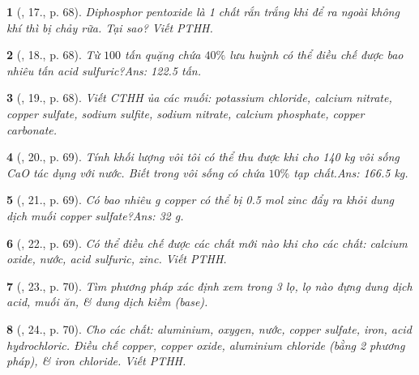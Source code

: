 \documentclass{article}
\newtheorem{baitoan}{}
\begin{document}
\begin{baitoan}[\cite{An_Hoa_Hoc_nang_cao_8_9}, 17., p. 68]
	Diphosphor pentoxide là 1 chất rắn trắng khi để ra ngoài không khí thì bị chảy rữa. Tại sao? Viết {\rm PTHH}.
\end{baitoan}
\begin{baitoan}[\cite{An_Hoa_Hoc_nang_cao_8_9}, 18., p. 68]
	Từ $100$ tấn quặng chứa $40\%$ lưu huỳnh có thể điều chế được bao nhiêu tấn acid sulfuric?\hfill{\sf Ans: 122.5 tấn.}
\end{baitoan}

\begin{baitoan}[\cite{An_Hoa_Hoc_nang_cao_8_9}, 19., p. 68]
	Viết {\rm CTHH} ủa các muối: potassium chloride, calcium nitrate, copper sulfate, sodium sulfite, sodium nitrate, calcium phosphate, copper carbonate.
\end{baitoan}

\begin{baitoan}[\cite{An_Hoa_Hoc_nang_cao_8_9}, 20., p. 69]
	Tính khối lượng vôi tôi {\rm{}} có thể thu được khi cho {\rm 140 kg} vôi sống {\rm CaO} tác dụng với nước. Biết trong vôi sống có chứa $10\%$ tạp chất.\hfill{\sf Ans: 166.5 kg.}
\end{baitoan}

\begin{baitoan}[\cite{An_Hoa_Hoc_nang_cao_8_9}, 21., p. 69]
	Có bao nhiêu {\rm g} copper có thể bị {\rm0.5 mol} zinc đẩy ra khỏi dung dịch muối copper sulfate?\hfill{\sf Ans: 32 g.}
\end{baitoan}

\begin{baitoan}[\cite{An_Hoa_Hoc_nang_cao_8_9}, 22., p. 69]
	Có thể điều chế được các chất mới nào khi cho các chất: calcium oxide, nước, acid sulfuric, zinc. Viết {\rm PTHH}.
\end{baitoan}

\begin{baitoan}[\cite{An_Hoa_Hoc_nang_cao_8_9}, 23., p. 70]
	Tìm phương pháp xác định xem trong 3 lọ, lọ nào đựng dung dịch acid, muối ăn, \& dung dịch kiềm (base).
\end{baitoan}

\begin{baitoan}[\cite{An_Hoa_Hoc_nang_cao_8_9}, 24., p. 70]
	Cho các chất: aluminium, oxygen, nước, copper sulfate, iron, acid hydrochloric. Điều chế copper, copper oxide, aluminium chloride (bằng 2 phương pháp), \& iron chloride. Viết {\rm PTHH}.
\end{baitoan}
\end{document}

